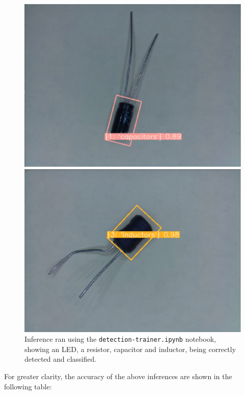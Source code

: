 \begin{figure}[H]
\begin{minipage}{0.49\textwidth}
    \includegraphics[width=\textwidth]{imgs/cv/2024-05-21_13-04-10_python.jpg}
  \end{minipage}
  \hfill
  \begin{minipage}{0.49\textwidth}
    \centering
    \includegraphics[width=\textwidth]{imgs/cv/2024-06-10_20-47-34_python.jpg}
  \end{minipage}
  \caption{Inference ran using the \texttt{detection-trainer.ipynb} notebook, showing an LED, a resistor, capacitor and inductor, being correctly detected and classified.}
  \label{fig:inference-components}
\end{figure}

For greater clarity, the accuracy of the above inferences are shown in the following table:

